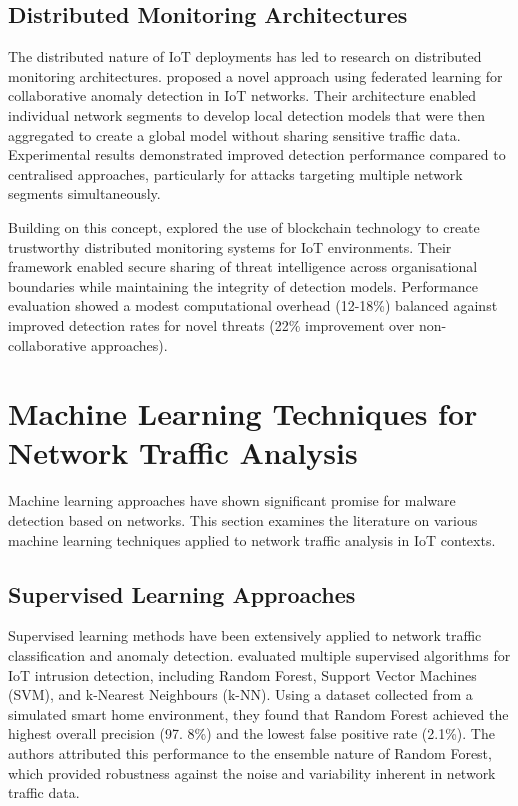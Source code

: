 \subsection{Distributed Monitoring Architectures}

The distributed nature of IoT deployments has led to research on distributed monitoring architectures. \cite{Diro2021} proposed a novel approach using federated learning for collaborative anomaly detection in IoT networks. Their architecture enabled individual network segments to develop local detection models that were then aggregated to create a global model without sharing sensitive traffic data. Experimental results demonstrated improved detection performance compared to centralised approaches, particularly for attacks targeting multiple network segments simultaneously.

Building on this concept, \cite{Koroniotis2019} explored the use of blockchain technology to create trustworthy distributed monitoring systems for IoT environments. Their framework enabled secure sharing of threat intelligence across organisational boundaries while maintaining the integrity of detection models. Performance evaluation showed a modest computational overhead (12-18\%) balanced against improved detection rates for novel threats (22\% improvement over non-collaborative approaches).

\section{Machine Learning Techniques for Network Traffic Analysis}

Machine learning approaches have shown significant promise for malware detection based on networks. This section examines the literature on various machine learning techniques applied to network traffic analysis in IoT contexts.

\subsection{Supervised Learning Approaches}

Supervised learning methods have been extensively applied to network traffic classification and anomaly detection. \citet{Anthi2019} evaluated multiple supervised algorithms for IoT intrusion detection, including Random Forest, Support Vector Machines (SVM), and k-Nearest Neighbours (k-NN). Using a dataset collected from a simulated smart home environment, they found that Random Forest achieved the highest overall precision (97. 8\%) and the lowest false positive rate (2.1\%). The authors attributed this performance to the ensemble nature of Random Forest, which provided robustness against the noise and variability inherent in network traffic data.

